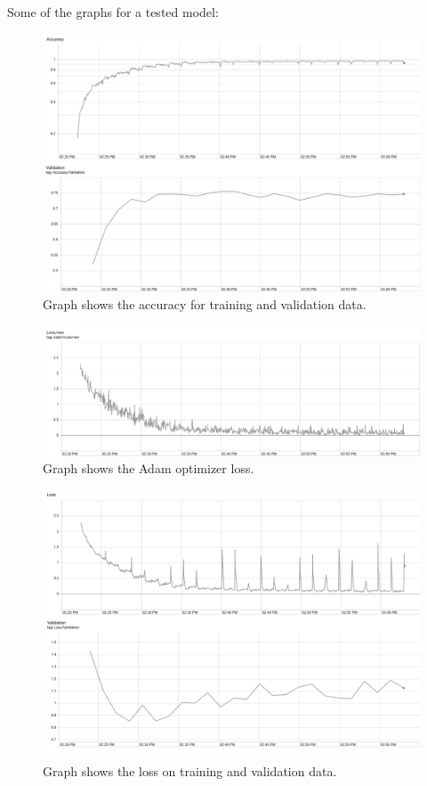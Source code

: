 \documentclass[conference]{IEEEtran}
\begin{document}
Some of the graphs for a tested model:
\begin{figure}[hbt!]
 \centering
    \includegraphics[scale=0.27]{accuracy.png}
        \caption{Graph shows the accuracy for training and validation data.}
	    \label{fig:my_label}
\end{figure}
\begin{figure}[hbt!]
 \centering
    \includegraphics[scale=0.27]{adam_loss.png}
        \caption{Graph shows the Adam optimizer loss.}
	    \label{fig:my_label}
\end{figure}
\begin{figure}[hbt!]
 \centering
    \includegraphics[scale=0.27]{loss.png}
        \caption{Graph shows the loss on training and validation data.}
	    \label{fig:my_label}
\end{figure}
\end{document}
